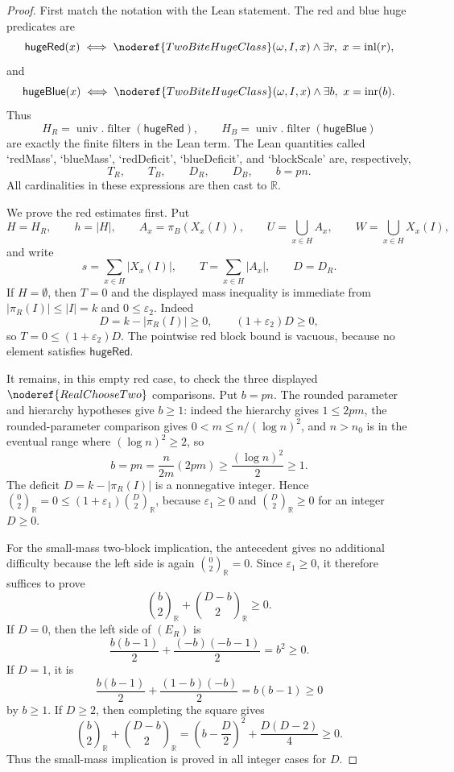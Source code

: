 \begin{proof}
First match the notation with the Lean statement.  The red and blue huge
predicates are
\[
\mathsf{hugeRed}(x)\iff
\noderef{TwoBiteHugeClass}(\omega,I,x)\wedge
  \exists r,\ x=\operatorname{inl}(r),
\]
and
\[
\mathsf{hugeBlue}(x)\iff
\noderef{TwoBiteHugeClass}(\omega,I,x)\wedge
  \exists b,\ x=\operatorname{inr}(b).
\]
Thus
\[
H_R=\operatorname{univ}.\operatorname{filter}(\mathsf{hugeRed}),
\qquad
H_B=\operatorname{univ}.\operatorname{filter}(\mathsf{hugeBlue})
\]
are exactly the finite filters in the Lean term.  The Lean quantities called
`redMass', `blueMass', `redDeficit', `blueDeficit', and `blockScale' are,
respectively,
\[
T_R,\qquad T_B,\qquad D_R,\qquad D_B,\qquad b=pn.
\]
All cardinalities in these expressions are then cast to \(\mathbb R\).

We prove the red estimates first.  Put
\[
H=H_R,\qquad h=|H|,\qquad
A_x=\pi_B(X_x(I)),\qquad
U=\bigcup_{x\in H}A_x,\qquad
W=\bigcup_{x\in H}X_x(I),
\]
and write
\[
s=\sum_{x\in H}|X_x(I)|,\qquad T=\sum_{x\in H}|A_x|,
\qquad D=D_R.
\]
If \(H=\emptyset\), then \(T=0\) and the displayed mass inequality is
immediate from \(|\pi_R(I)|\le |I|=k\) and \(0\le\varepsilon_2\).  Indeed
\[
D=k-|\pi_R(I)|\ge0,\qquad (1+\varepsilon_2)D\ge0,
\]
so \(T=0\le(1+\varepsilon_2)D\).  The pointwise red block bound is vacuous,
because no element satisfies \(\mathsf{hugeRed}\).

It remains, in this empty red case, to check the three displayed
\(\noderef{RealChooseTwo}\) comparisons.  Put \(b=pn\).  The rounded
parameter and hierarchy hypotheses give \(b\ge1\): indeed the hierarchy gives
\(1\le2pm\), the rounded-parameter comparison gives
\(0<m\le n/(\log n)^2\), and \(n>n_0\) is in the eventual range where
\((\log n)^2\ge2\), so
\[
b=pn=\frac{n}{2m}(2pm)\ge\frac{(\log n)^2}{2}\ge1.
\]
The deficit \(D=k-|\pi_R(I)|\) is a nonnegative integer.  Hence
\(\binom{0}{2}_{\mathbb R}=0\le(1+\varepsilon_1)\binom D2_{\mathbb R}\),
because \(\varepsilon_1\ge0\) and \(\binom D2_{\mathbb R}\ge0\) for an
integer \(D\ge0\).

For the small-mass two-block implication, the antecedent gives no additional
difficulty because the left side is again \(\binom02_{\mathbb R}=0\).  Since
\(\varepsilon_1\ge0\), it therefore suffices to prove
\[
\binom b2_{\mathbb R}+\binom{D-b}{2}_{\mathbb R}\ge0. \tag{E_R}
\]
If \(D=0\), then the left side of \((E_R)\) is
\[
\frac{b(b-1)}2+\frac{(-b)(-b-1)}2=b^2\ge0.
\]
If \(D=1\), it is
\[
\frac{b(b-1)}2+\frac{(1-b)(-b)}2=b(b-1)\ge0
\]
by \(b\ge1\).  If \(D\ge2\), then completing the square gives
\[
\binom b2_{\mathbb R}+\binom{D-b}{2}_{\mathbb R}
=\left(b-\frac D2\right)^2+\frac{D(D-2)}4\ge0.
\]
Thus the small-mass implication is proved in all integer cases for \(D\).


\end{proof}
